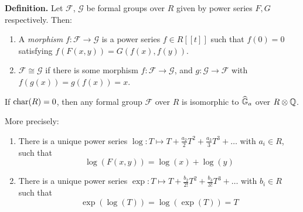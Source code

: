 \documentclass[10pt,a4paper]{article}
\begin{document}
\textbf{Definition.} Let $\mathcal{F}$, $\mathcal{G}$ be formal groups over $R$ given by power series $F, G$ respectively. Then:
\begin{enumerate}
  \item A \emph{morphism} $f: \mathcal{F} \to \mathcal{G}$ is a power series $f \in R[[t]]$ such that $f(0)=0$ satisfying $f(F(x, y)) = G(f(x), f(y))$.
  \item $\mathcal{F} \cong \mathcal{G}$ if there is some morphism $f : \mathcal{F} \to \mathcal{G}$, and $g: \mathcal{G} \to \mathcal{F}$ with $f(g(x))=g(f(x)) = x$.
\end{enumerate}
\begin{theorem}
  If $\operatorname{char}(R) = 0$, then any formal group $\mathcal{F}$ over $R$ is isomorphic to $\widehat{\mathbb{G}}_a$ over $R \otimes \mathbb{Q}$.

  More precisely:
  \begin{enumerate}
    \item There is a unique power series $\log: T\mapsto T+\frac{a_2}{2}T^2+\frac{a_3}{3}T^3+\ldots$ with $a_i \in R$, such that \[\log(F(x,y)) = \log(x)+\log(y)\tag{$\ast$}\]
    \item There is a unique power series $\exp: T \mapsto T + \frac{b_2}{2!}T^2 + \frac{b_3}{3!}T^3+\ldots$ with $b_i \in R$ such that \[\exp(\log(T)) = \log(\exp(T)) = T\]
  \end{enumerate}
\end{theorem}
\end{document}
